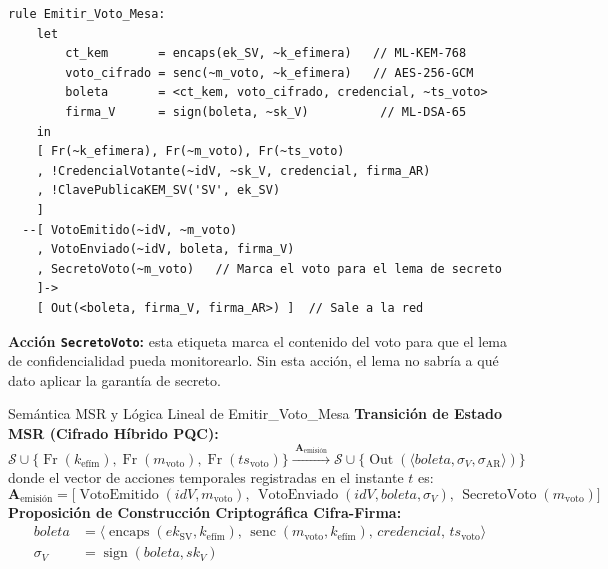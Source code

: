 \documentclass[12pt, a4paper, twoside, openright]{book}
\begin{document}
\begin{lstlisting}[caption={El votante cifra su voto con ML-KEM y lo firma con ML-DSA.}]
rule Emitir_Voto_Mesa:
    let
        ct_kem       = encaps(ek_SV, ~k_efimera)   // ML-KEM-768
        voto_cifrado = senc(~m_voto, ~k_efimera)   // AES-256-GCM
        boleta       = <ct_kem, voto_cifrado, credencial, ~ts_voto>
        firma_V      = sign(boleta, ~sk_V)          // ML-DSA-65
    in
    [ Fr(~k_efimera), Fr(~m_voto), Fr(~ts_voto)
    , !CredencialVotante(~idV, ~sk_V, credencial, firma_AR)
    , !ClavePublicaKEM_SV('SV', ek_SV)
    ]
  --[ VotoEmitido(~idV, ~m_voto)
    , VotoEnviado(~idV, boleta, firma_V)
    , SecretoVoto(~m_voto)   // Marca el voto para el lema de secreto
    ]->
    [ Out(<boleta, firma_V, firma_AR>) ]  // Sale a la red
\end{lstlisting}

\textbf{Acci\'on \texttt{SecretoVoto}:} esta etiqueta marca el
contenido del voto para que el lema de confidencialidad pueda
monitorearlo. Sin esta acci\'on, el lema no sabr\'ia a qu\'e dato
aplicar la garant\'ia de secreto.

\begin{cajaLogica}{Sem\'antica MSR y L\'ogica Lineal de Emitir\_Voto\_Mesa}
  \textbf{Transici\'on de Estado MSR (Cifrado H\'ibrido PQC):}
  \[
    \mathcal{S} \cup \{ \operatorname{Fr}(\mathit{k}_{\text{ef\'im}}), \operatorname{Fr}(\mathit{m}_{\text{voto}}), \operatorname{Fr}(\mathit{ts}_{\text{voto}}) \}
    \xrightarrow{\;\mathbf{A}_{\text{emisi\'on}}\;}
    \mathcal{S} \cup \{ \operatorname{Out}(\langle \mathit{boleta}, \sigma_V, \sigma_{\mathrm{AR}} \rangle) \}
  \]
  donde el vector de acciones temporales registradas en el instante $t$ es:
  \[
    \mathbf{A}_{\text{emisi\'on}} = \big[
      \operatorname{VotoEmitido}(\mathit{idV}, \mathit{m}_{\text{voto}}),\,
      \operatorname{VotoEnviado}(\mathit{idV}, \mathit{boleta}, \sigma_V),\,
      \operatorname{SecretoVoto}(\mathit{m}_{\text{voto}})
    \big]
  \]
  \textbf{Proposici\'on de Construcci\'on Criptogr\'afica Cifra-Firma:}
  \[
    \begin{aligned}
      \mathit{boleta} &= \big\langle \operatorname{encaps}(\mathit{ek}_{\mathrm{SV}}, \mathit{k}_{\text{ef\'im}}),\,
      \operatorname{senc}(\mathit{m}_{\text{voto}}, \mathit{k}_{\text{ef\'im}}),\, \mathit{credencial},\, \mathit{ts}_{\text{voto}} \big\rangle \\
      \sigma_V &= \operatorname{sign}(\mathit{boleta}, \mathit{sk}_V)
    \end{aligned}
  \]
\end{cajaLogica}
\end{document}
